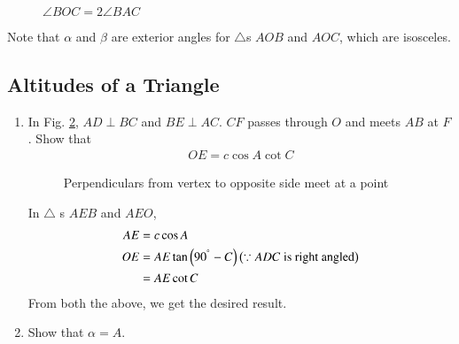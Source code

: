 \begin{enumerate}[label=\arabic*.,ref=\thesubsection.\theenumi]
\begin{figure}[!ht]
	\begin{center}
		
		\resizebox{\columnwidth}{!}{}
	\end{center}
	\caption{$\angle BOC = 2\angle BAC$}
	\label{ch3_perp_bisector_circ}	
\end{figure}
%
\solution Note that $\alpha$ and $\beta $ are exterior angles for $\triangle$s $AOB$ and $AOC$, which are isosceles.
\end{enumerate}

\subsection{Altitudes of a Triangle}
\renewcommand{\theequation}{\theenumi}
\begin{enumerate}[label=\arabic*.,ref=\thesubsection.\theenumi]
\item
	In Fig. \ref{ch3_perp_triang}, $AD \perp BC$ and $BE \perp AC$. $CF$ passes through $O$ and meets
	$AB$ at $F$.  	
	Show that 
	\begin{align}
	OE = c \cos A \cot C
	\end{align}

	\begin{figure}[!ht]
		\begin{center}
			
			\resizebox{\columnwidth}{!}{}
		\end{center}
		\caption{Perpendiculars from vertex to opposite side meet at a point}
		\label{ch3_perp_triang}	
	\end{figure}
%
\solution In $\triangle$ s $AEB$ and $AEO$,
%
\begin{align}
AE &= c \cos A \\
OE &= AE \tan \left(90^{\degree} - C\right) \left(\because ADC \text{ is right angled}\right) \\
&= AE \cot C
\end{align}
%
From both the above, we get the desired result.
%
\item
	Show that $\alpha = A$.


\end{enumerate}
